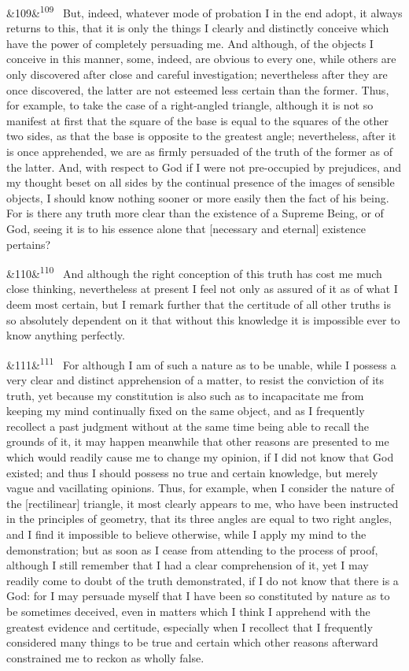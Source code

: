 \documentclass[12pt]{article}
\newcommand{\para}[1][]{\par\noindent\ifx&#1&\else\textsuperscript{\footnotesize #1}~\fi}
\begin{document}
\para[109] But, indeed, whatever mode of probation I in the end adopt, it always returns to this, that it is only the things I clearly and distinctly conceive which have the power of completely persuading me. And although, of the objects I conceive in this manner, some, indeed, are obvious to every one, while others are only discovered after close and careful investigation; nevertheless after they are once discovered, the latter are not esteemed less certain than the former. Thus, for example, to take the case of a right-angled triangle, although it is not so manifest at first that the square of the base is equal to the squares of the other two sides, as that the base is opposite to the greatest angle; nevertheless, after it is once apprehended, we are as firmly persuaded of the truth of the former as of the latter. And, with respect to God if I were not pre-occupied by prejudices, and my thought beset on all sides by the continual presence of the images of sensible objects, I should know nothing sooner or more easily then the fact of his being. For is there any truth more clear than the existence of a Supreme Being, or of God, seeing it is to his essence alone that [necessary and eternal] existence pertains?

\para[110] And although the right conception of this truth has cost me much close thinking, nevertheless at present I feel not only as assured of it as of what I deem most certain, but I remark further that the certitude of all other truths is so absolutely dependent on it that without this knowledge it is impossible ever to know anything perfectly.

\para[111] For although I am of such a nature as to be unable, while I possess a very clear and distinct apprehension of a matter, to resist the conviction of its truth, yet because my constitution is also such as to incapacitate me from keeping my mind continually fixed on the same object, and as I frequently recollect a past judgment without at the same time being able to recall the grounds of it, it may happen meanwhile that other reasons are presented to me which would readily cause me to change my opinion, if I did not know that God existed; and thus I should possess no true and certain knowledge, but merely vague and vacillating opinions. Thus, for example, when I consider the nature of the [rectilinear] triangle, it most clearly appears to me, who have been instructed in the principles of geometry, that its three angles are equal to two right angles, and I find it impossible to believe otherwise, while I apply my mind to the demonstration; but as soon as I cease from attending to the process of proof, although I still remember that I had a clear comprehension of it, yet I may readily come to doubt of the truth demonstrated, if I do not know that there is a God: for I may persuade myself that I have been so constituted by nature as to be sometimes deceived, even in matters which I think I apprehend with the greatest evidence and certitude, especially when I recollect that I frequently considered many things to be true and certain which other reasons afterward constrained me to reckon as wholly false.
\end{document}
